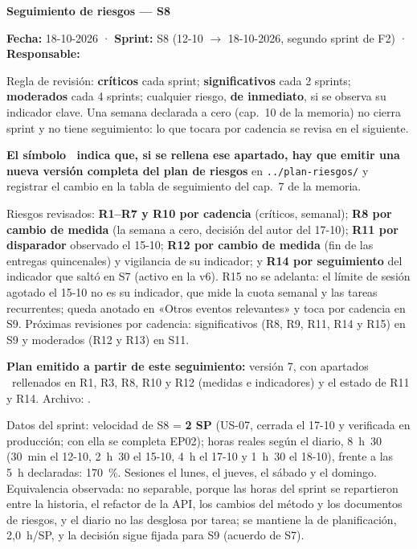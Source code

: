 \documentclass[11pt,a4paper]{article}
\begin{document}
\begin{center}
  {\LARGE\bfseries Seguimiento de riesgos — S8}\\[6pt]
\end{center}

\textbf{Fecha:} 18-10-2026 · \textbf{Sprint:} S8 (12-10 \(\to\) 18-10-2026, segundo sprint de F2) · \textbf{Responsable:} \thesisAuthor

Regla de revisión: \textbf{críticos} cada sprint; \textbf{significativos} cada 2 sprints; \textbf{moderados} cada 4 sprints; cualquier riesgo, \textbf{de inmediato}, si se observa su indicador clave.
Una semana declarada a cero (cap.~10 de la memoria) no cierra sprint y no tiene seguimiento: lo que tocara por cadencia se revisa en el siguiente.

\textbf{El símbolo \updatesymbol\ indica que, si se rellena ese apartado, hay que emitir una nueva versión completa del plan de riesgos} en \texttt{../plan-riesgos/} y registrar el cambio en la tabla de seguimiento del cap.~7 de la memoria.

Riesgos revisados:
\textbf{R1--R7 y R10 por cadencia} (críticos, semanal);
\textbf{R8 por cambio de medida} (la semana a cero, decisión del autor del 17-10);
\textbf{R11 por disparador} observado el 15-10;
\textbf{R12 por cambio de medida} (fin de las entregas quincenales) y vigilancia de su indicador;
y \textbf{R14 por seguimiento} del indicador que saltó en S7 (activo en la v6).
R15 no se adelanta: el límite de sesión agotado el 15-10 no es su indicador, que mide la cuota semanal y las tareas recurrentes; queda anotado en «Otros eventos relevantes» y toca por cadencia en S9.
Próximas revisiones por cadencia: significativos (R8, R9, R11, R14 y R15) en S9 y moderados (R12 y R13) en S11.

\textbf{Plan emitido a partir de este seguimiento:} versión 7, con apartados \updatesymbol\ rellenados en R1, R3, R8, R10 y R12 (medidas e indicadores) y el estado de R11 y R14.\newline
Archivo: .

Datos del sprint: velocidad de S8 = \textbf{2 SP} (US-07, cerrada el 17-10 y verificada en producción; con ella se completa EP02); horas reales según el diario, 8~h~30 (30~min el 12-10, 2~h~30 el 15-10, 4~h el 17-10 y 1~h~30 el 18-10), frente a las 5~h declaradas: 170~\%.
Sesiones el lunes, el jueves, el sábado y el domingo.
Equivalencia observada: no separable, porque las horas del sprint se repartieron entre la historia, el refactor de la API, los cambios del método y los documentos de riesgos, y el diario no las desglosa por tarea; se mantiene la de planificación, 2,0~h/SP, y la decisión sigue fijada para S9 (acuerdo de S7).
\end{document}
